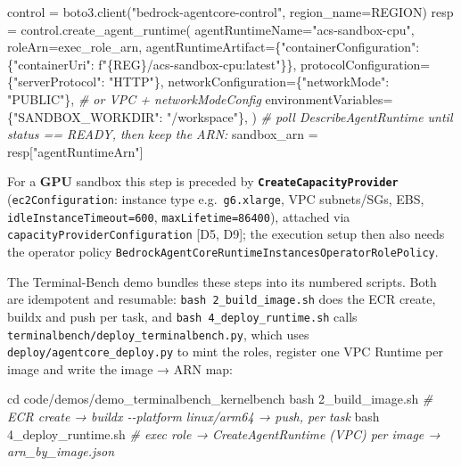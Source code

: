 \documentclass[
  paper=a4,
  ,captions=tableheading
]{scrartcl}
\newenvironment{Shaded}{}{}
\newcommand{\BuiltInTok}[1]{\textcolor[rgb]{0.00,0.50,0.00}{#1}}
\newcommand{\CommentTok}[1]{\textcolor[rgb]{0.38,0.63,0.69}{\textit{#1}}}
\newcommand{\FunctionTok}[1]{\textcolor[rgb]{0.02,0.16,0.49}{#1}}
\newcommand{\NormalTok}[1]{#1}
\newcommand{\OperatorTok}[1]{\textcolor[rgb]{0.40,0.40,0.40}{#1}}
\newcommand{\SpecialCharTok}[1]{\textcolor[rgb]{0.25,0.44,0.63}{#1}}
\newcommand{\SpecialStringTok}[1]{\textcolor[rgb]{0.73,0.40,0.53}{#1}}
\newcommand{\StringTok}[1]{\textcolor[rgb]{0.25,0.44,0.63}{#1}}
\begin{document}
\begin{Shaded}
\begin{Highlighting}[]
\NormalTok{control }\OperatorTok{=}\NormalTok{ boto3.client(}\StringTok{"bedrock{-}agentcore{-}control"}\NormalTok{, region\_name}\OperatorTok{=}\NormalTok{REGION)}
\NormalTok{resp }\OperatorTok{=}\NormalTok{ control.create\_agent\_runtime(}
\NormalTok{    agentRuntimeName}\OperatorTok{=}\StringTok{"acs{-}sandbox{-}cpu"}\NormalTok{,}
\NormalTok{    roleArn}\OperatorTok{=}\NormalTok{exec\_role\_arn,}
\NormalTok{    agentRuntimeArtifact}\OperatorTok{=}\NormalTok{\{}\StringTok{"containerConfiguration"}\NormalTok{: \{}\StringTok{"containerUri"}\NormalTok{: }\SpecialStringTok{f"}\SpecialCharTok{\{}\NormalTok{REG}\SpecialCharTok{\}}\SpecialStringTok{/acs{-}sandbox{-}cpu:latest"}\NormalTok{\}\},}
\NormalTok{    protocolConfiguration}\OperatorTok{=}\NormalTok{\{}\StringTok{"serverProtocol"}\NormalTok{: }\StringTok{"HTTP"}\NormalTok{\},}
\NormalTok{    networkConfiguration}\OperatorTok{=}\NormalTok{\{}\StringTok{"networkMode"}\NormalTok{: }\StringTok{"PUBLIC"}\NormalTok{\},   }\CommentTok{\# or VPC + networkModeConfig}
\NormalTok{    environmentVariables}\OperatorTok{=}\NormalTok{\{}\StringTok{"SANDBOX\_WORKDIR"}\NormalTok{: }\StringTok{"/workspace"}\NormalTok{\},}
\NormalTok{)}
\CommentTok{\# poll DescribeAgentRuntime until status == READY, then keep the ARN:}
\NormalTok{sandbox\_arn }\OperatorTok{=}\NormalTok{ resp[}\StringTok{"agentRuntimeArn"}\NormalTok{]}
\end{Highlighting}
\end{Shaded}

For a \textbf{GPU} sandbox this step is preceded by
\textbf{\texttt{CreateCapacityProvider}} (\texttt{ec2Configuration}:
instance type e.g.~\texttt{g6.xlarge}, VPC subnets/SGs, EBS,
\texttt{idleInstanceTimeout=600}, \texttt{maxLifetime=86400}), attached
via \texttt{capacityProviderConfiguration} {[}D5, D9{]}; the execution
setup then also needs the operator policy
\texttt{BedrockAgentCoreRuntimeInstancesOperatorRolePolicy}.

The Terminal-Bench demo bundles these steps into its numbered scripts.
Both are idempotent and resumable: \texttt{bash\ 2\_build\_image.sh}
does the ECR create, buildx and push per task, and
\texttt{bash\ 4\_deploy\_runtime.sh} calls
\texttt{terminalbench/deploy\_terminalbench.py}, which uses
\texttt{deploy/agentcore\_deploy.py} to mint the roles, register one VPC
Runtime per image and write the image → ARN map:

\begin{Shaded}
\begin{Highlighting}[]
\BuiltInTok{cd}\NormalTok{ code/demos/demo\_terminalbench\_kernelbench}
\FunctionTok{bash}\NormalTok{ 2\_build\_image.sh      }\CommentTok{\# ECR create → buildx {-}{-}platform linux/arm64 → push, per task}
\FunctionTok{bash}\NormalTok{ 4\_deploy\_runtime.sh   }\CommentTok{\# exec role → CreateAgentRuntime (VPC) per image → arn\_by\_image.json}
\end{Highlighting}
\end{Shaded}
\end{document}

